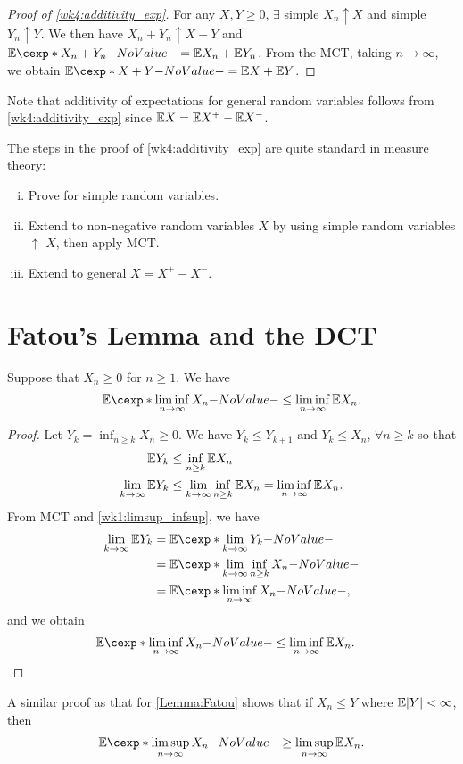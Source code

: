\documentclass[12pt]{article}
\begin{document}
\begin{proof}[Proof of \cref{wk4:additivity_exp}]
For any $X,Y\geq 0$, $\exists$ simple $X_n \uparrow X$ and simple $Y_n \uparrow Y$. We then have $X_n+Y_n \uparrow X+Y$ and $\E[X_n+Y_n] = \E X_n+ \E Y_n$. From the MCT, taking $n\to\infty$, we obtain $\E[X+Y] = \E X+ \E Y$. 
\end{proof}

Note that additivity of expectations for general random variables follows from \cref{wk4:additivity_exp} since $\E X = \E X^+ - \E X^-$.


The steps in the proof of \cref{wk4:additivity_exp} are quite standard in measure theory:
\begin{enumerate}[(i)]
\item Prove for simple random variables.
\item Extend to non-negative random variables $X$ by using simple random variables $\uparrow$ $X$, then apply MCT.
\item Extend to general $X=X^+-X^-$.
\end{enumerate}

\section{Fatou's Lemma and the DCT}

\begin{Lemma} \label{Lemma:Fatou}
Suppose that $X_n\geq 0$ for $n\geq 1$. We have
\begin{align*}
\E[\liminf_{n \to \infty}{X_n}] \leq  \liminf_{n \to \infty}\E X_n.
\end{align*}
\end{Lemma}
\begin{proof}
Let $Y_k= \inf_{n\geq k} X_n\geq 0$. We have $Y_k \leq Y_{k+1}$ and $Y_k \leq X_n$, $\forall n\geq k$ so that 
\begin{align*}
\E Y_k &\leq \inf_{n\geq k} {\E X_n} \\
\lim_{k\to \infty}{\E Y_k} &\leq \lim_{k\to \infty}{\inf_{n\geq k} {\E X_n}}= \liminf_{n\to \infty}{\E X_n}.
\end{align*}
From MCT and \cref{wk1:limsup_infsup}, we have
\begin{align*}
\lim_{k\to \infty}{\E Y_k}
&=\E[\lim_{k\to \infty} {Y_k}]\\
&=\E[\lim_{k\to \infty} {\inf_{n\geq k}{X_n}}]\\
&=\E[\liminf_{n\to \infty}{ X_n}],
\end{align*}
and we obtain
\begin{align*}
\E[\liminf_{n \to \infty}{X_n}] &\leq  \liminf_{n \to \infty}\E X_n.
\end{align*}
\end{proof}
A similar proof as that for \cref{Lemma:Fatou} shows that if $X_n \leq Y$ where $\E|Y|<\infty$, then
\begin{align*}
\E[\limsup_{n\to\infty} X_n] \geq \limsup_{n\to\infty} \E X_n.
\end{align*}
\end{document}
